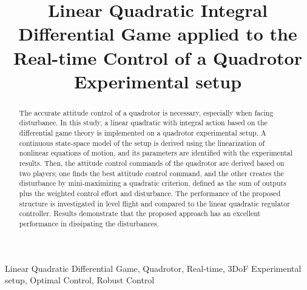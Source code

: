 \documentclass[conference]{IEEEtran}
\begin{document}
\title{Linear Quadratic Integral Differential Game applied to the Real-time Control of a Quadrotor Experimental setup\\
}

\author{
\and
{}
\and
{}

}

\maketitle

\begin{abstract}
	The accurate attitude control of a quadrotor is necessary, especially when facing disturbance. In this study, a linear quadratic with integral action based on the differential game theory is implemented on a quadrotor experimental setup. A continuous state-space model of the setup is derived using the linearization of nonlinear equations of motion,
	and its parameters are identified with the experimental results.
	Then, the attitude control commands of the quadrotor are derived based on two players; one finds the best attitude control command, and the other creates the disturbance by mini-maximizing a quadratic criterion, defined as the sum of outputs plus the weighted control effort and disturbance. The performance of the proposed structure is investigated in level flight and compared to the linear quadratic regulator controller. Results demonstrate that the proposed approach has an excellent performance in dissipating the disturbances.
\end{abstract}
\begin{IEEEkeywords}
    Linear Quadratic Differential Game, Quadrotor, Real-time, 3DoF Experimental setup, Optimal Control, Robust Control
\end{IEEEkeywords}
\end{document}
